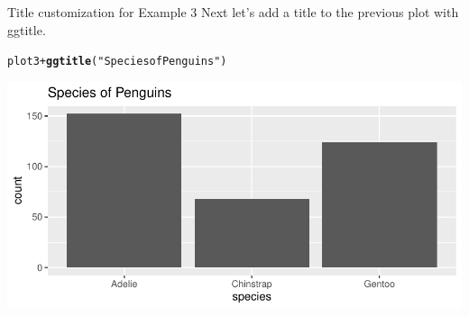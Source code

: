 \documentclass{beamer}\usepackage[]{graphicx}\usepackage[]{color}
\makeatletter
\newcommand{\hlstr}[1]{\textcolor[rgb]{0.192,0.494,0.8}{#1}}%
\newcommand{\hlopt}[1]{\textcolor[rgb]{0,0,0}{#1}}%
\newcommand{\hlstd}[1]{\textcolor[rgb]{0.345,0.345,0.345}{#1}}%
\newcommand{\hlkwd}[1]{\textcolor[rgb]{0.737,0.353,0.396}{\textbf{#1}}}%
\newenvironment{kframe}{%
 \def\at@end@of@kframe{}%
 \ifinner\ifhmode%
  \def\at@end@of@kframe{\end{minipage}}%
  \begin{minipage}{\columnwidth}%
 \fi\fi%
 \def\FrameCommand##1{\hskip\@totalleftmargin \hskip-\fboxsep
 \colorbox{shadecolor}{##1}\hskip-\fboxsep
     \hskip-\linewidth \hskip-\@totalleftmargin \hskip\columnwidth}%
 \MakeFramed {\advance\hsize-\width
   \@totalleftmargin\z@ \linewidth\hsize
   \@setminipage}}%
 {\par\unskip\endMakeFramed%
 \at@end@of@kframe}
\newenvironment{knitrout}{}{} %
\makeatother
\begin{document}
\begin{frame}[fragile]{Title customization for Example 3}
Next let's add a title to the previous plot with ggtitle.
\begin{knitrout}
\color{fgcolor}\begin{kframe}
\begin{alltt}
\hlstd{plot3} \hlopt{+} \hlkwd{ggtitle}\hlstd{(}\hlstr{"Species of Penguins"}\hlstd{)}
\end{alltt}
\end{kframe}
\includegraphics[width=0.95\linewidth]{figure/unnamed-chunk-10-1} 
\end{knitrout}
\end{frame}
\end{document}
